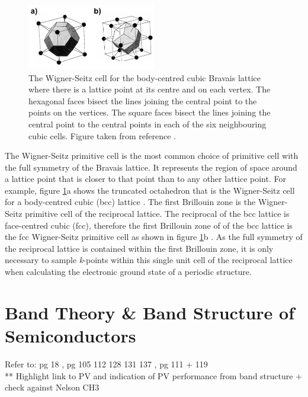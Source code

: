 \begin{figure}[h!]
  \centering
    \includegraphics[width=0.5\textwidth]{figures/Wigner-Seitz.png}
    \caption{The Wigner-Seitz cell for the body-centred cubic Bravais lattice where there is a lattice point at its centre and on each vertex. The hexagonal faces bisect the lines joining the central point to the points on the vertices. The square faces bisect the lines joining the central point to the central points in each of the six neighbouring cubic cells. Figure taken from reference .}
  \label{Wigner-Seitz}
\end{figure}

The Wigner-Seitz primitive cell is the most common choice of primitive cell with the full symmetry of the Bravais lattice. It represents the region of space around a lattice point  that is closer to that point than to any other lattice point. For example, figure \ref{Wigner-Seitz}a shows the truncated octahedron that is the Wigner-Seitz cell for a body-centred cubic (bcc) lattice \cite{AshcroftMermin2}.
The first Brillouin zone is the Wigner-Seitz primitive cell of the reciprocal lattice. The reciprocal of the bcc lattice is face-centred cubic (fcc), therefore the first Brillouin zone of  of the bcc lattice is the fcc Wigner-Seitz primitive cell as shown in figure \ref{Wigner-Seitz}b \cite{AshcroftMermin3}. As the full symmetry of the reciprocal lattice is contained within the first Brillouin zone, it is only necessary to sample \textit{k}-points within this single unit cell of the reciprocal lattice when calculating the electronic ground state of a periodic structure.

 
\section{Band Theory \& Band Structure of Semiconductors}\label{band_theory}
Refer to: pg 18 \cite{fund_semi}, pg 105 112 128 131 137 \cite{thin_film_Boer}, pg 111 + 119 \cite{phys_semicond}\\

** Highlight link to PV and indication of PV performance from band structure + check against Nelson CH3\\


